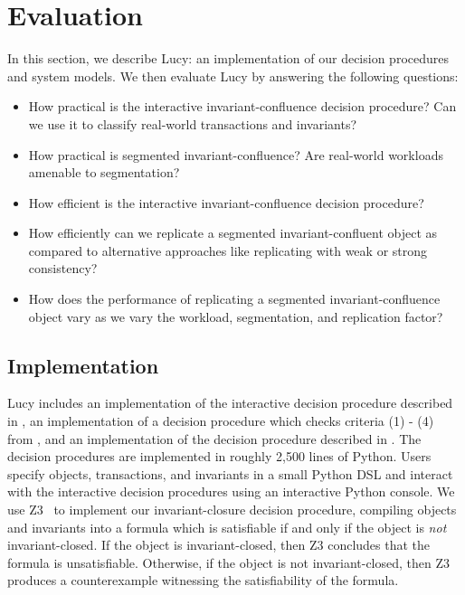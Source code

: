 \section{Evaluation}
In this section, we describe Lucy: an implementation of our decision procedures
and system models. We then evaluate Lucy by answering the following questions:
\begin{itemize}
  \item
    How practical is the interactive invariant-confluence decision procedure?
    Can we use it to classify real-world transactions and invariants?
  \item
    How practical is segmented invariant-confluence? Are real-world workloads
    amenable to segmentation?
  \item
    How efficient is the interactive invariant-confluence decision procedure?
  \item
    How efficiently can we replicate a segmented invariant-confluent object as
    compared to alternative approaches like replicating with weak or strong
    consistency?
  \item
    How does the performance of replicating a segmented invariant-confluence
    object vary as we vary the workload, segmentation, and replication factor?
\end{itemize}

\subsection{Implementation}
Lucy includes an implementation of the interactive decision procedure described
in , an implementation of a decision
procedure which checks criteria (1) - (4) from , and an
implementation of the decision procedure described in
. The decision procedures
are implemented in roughly 2,500 lines of Python. Users specify objects,
transactions, and invariants in a small Python DSL and interact with the
interactive decision procedures using an interactive Python console. We use
Z3~\cite{de2008z3} to implement our invariant-closure decision procedure,
compiling objects and invariants into a formula which is satisfiable if and
only if the object is \emph{not} invariant-closed. If the object is
invariant-closed, then Z3 concludes that the formula is unsatisfiable.
Otherwise, if the object is not invariant-closed, then Z3 produces a
counterexample witnessing the satisfiability of the formula.

